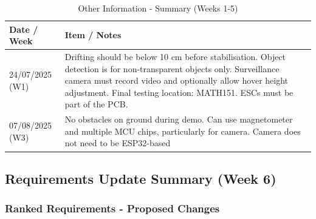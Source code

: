 \begin{table}[H]
\centering
\caption{Other Information - Summary (Weeks 1-5)}
\begin{tabular}{|p{2.5cm}|p{12cm}|}
\hline
\textbf{Date / Week} & \textbf{Item / Notes} \\ \hline
24/07/2025 (W1) &
Drifting should be below 10 cm before stabilisation.  \newline 
Object detection is for non-transparent objects only.  \newline 
Surveillance camera must record video and optionally allow hover height adjustment. \newline
Final testing location: MATH151. \newline
ESCs must be part of the PCB. \\ \hline
07/08/2025 (W3) &
No obstacles on ground during demo. \newline
Can use magnetometer and multiple MCU chips, particularly for camera. \newline Camera does not need to be ESP32-based \newline \\ \hline
\end{tabular}
\end{table}

\pagebreak
\subsection{Requirements Update Summary (Week 6)}
\label{app:req-changes}

\subsubsection{Ranked Requirements - Proposed Changes}

